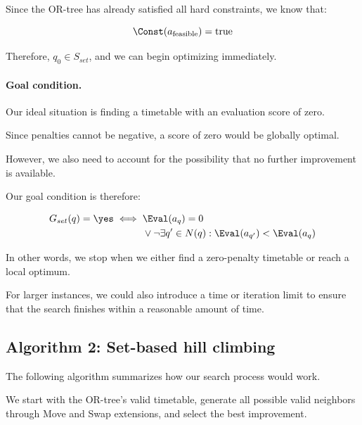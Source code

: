 Since the OR-tree has already satisfied all hard constraints, we know that:

\begin{equation}
    \Const(a_{\mathrm{feasible}})=\mathrm{true}
\end{equation}

Therefore, $q_0\in S_{set}$, and we can begin optimizing immediately.

\paragraph{Goal condition.}

Our ideal situation is finding a timetable with an evaluation score of zero.

Since penalties cannot be negative, a score of zero would be globally optimal.

However, we also need to account for the possibility that no further improvement is available.

Our goal condition is therefore:

\begin{equation}
    \begin{aligned}
    G_{set}(q)=\yes
    \iff\;&
    \Eval(a_q)=0\\
    &\lor
    \neg\exists q'\in N(q):
    \Eval(a_{q'})<\Eval(a_q)
    \end{aligned}
\end{equation}

In other words, we stop when we either find a zero-penalty timetable or reach a local optimum.

For larger instances, we could also introduce a time or iteration limit to ensure that the search finishes within a reasonable amount of time.

\subsection{Algorithm 2: Set-based hill climbing}

The following algorithm summarizes how our search process would work.

We start with the OR-tree's valid timetable, generate all possible valid neighbors through Move and Swap extensions, and select the best improvement.

